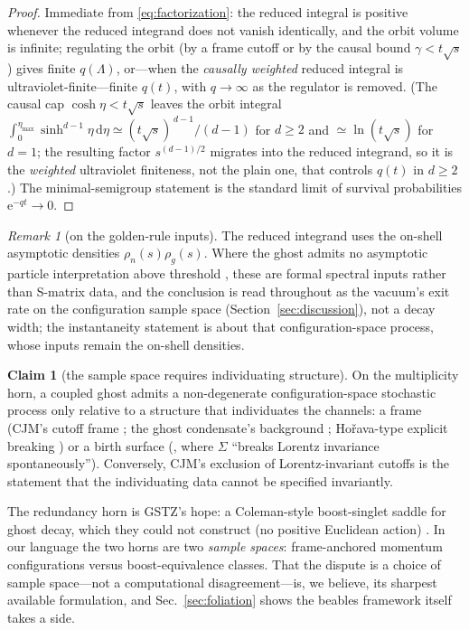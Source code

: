 \documentclass[11pt]{article}
\theoremstyle{definition}
\newtheorem{claim}[theorem]{Claim}
\theoremstyle{remark}
\newtheorem{remark}[theorem]{Remark}
\newcommand{\dd}{\mathrm{d}}
\newcommand{\ee}{\mathrm{e}}
\begin{document}
\begin{proof}
Immediate from \eqref{eq:factorization}: the reduced integral is
positive whenever the reduced integrand does not vanish identically, and the orbit volume is
infinite; regulating the orbit (by a frame cutoff \cite{CJM2004} or
by the causal bound $\gamma<t\sqrt s$ \cite{CJM2004,GV2013}) gives
finite $q(\Lambda)$, or---when the \emph{causally weighted} reduced
integral is ultraviolet-finite---finite $q(t)$, with $q\to\infty$ as the
regulator is removed. (The causal cap $\cosh\eta<t\sqrt s$ leaves the
orbit integral $\int_0^{\eta_{\max}}\!\sinh^{d-1}\!\eta\,\dd\eta\simeq
(t\sqrt s)^{\,d-1}/(d-1)$ for $d\ge2$ and $\simeq\ln(t\sqrt s)$ for
$d=1$; the resulting factor $s^{(d-1)/2}$ migrates into the reduced
integrand, so it is the \emph{weighted} ultraviolet finiteness, not the
plain one, that controls $q(t)$ in $d\ge2$.) The minimal-semigroup statement is the standard limit of
survival probabilities $\ee^{-q t}\to0$.
\end{proof}

\begin{remark}[on the golden-rule inputs]
The reduced integrand uses the on-shell asymptotic densities
$\rho_n(s)\rho_g(s)$. Where the ghost admits no asymptotic particle
interpretation above threshold \cite{Buoninfante2026}, these are formal
spectral inputs rather than S-matrix data, and the conclusion is read
throughout as the vacuum's exit rate on the configuration sample space
(Section~\ref{sec:discussion}), not a decay width; the instantaneity
statement is about that configuration-space process, whose inputs
remain the on-shell densities.
\end{remark}

\begin{claim}[the sample space requires individuating structure]
\label{claim:frame}
On the multiplicity horn, a coupled ghost admits a non-degenerate
configuration-space stochastic process only relative to a structure
that individuates the channels: a frame (CJM's cutoff frame
\cite{CJM2004}; the ghost condensate's background
\cite{GhostCondensate}; Ho\v rava-type explicit breaking
\cite{Horava-ghosts}) or a birth surface (\cite{GV2013}, where
$\Sigma$ ``breaks Lorentz invariance spontaneously''). Conversely,
CJM's exclusion of Lorentz-invariant cutoffs is the statement that
the individuating data cannot be specified invariantly.
\end{claim}

The redundancy horn is GSTZ's hope: a Coleman-style boost-singlet
saddle for ghost decay, which they could not construct (no positive
Euclidean action) \cite{GSTZ2021}. In our language the two horns are
two \emph{sample spaces}: frame-anchored momentum configurations
versus boost-equivalence classes. That the dispute is a choice of
sample space---not a computational disagreement---is, we believe, its
sharpest available formulation, and Sec.~\ref{sec:foliation} shows
the beables framework itself takes a side.
\end{document}
